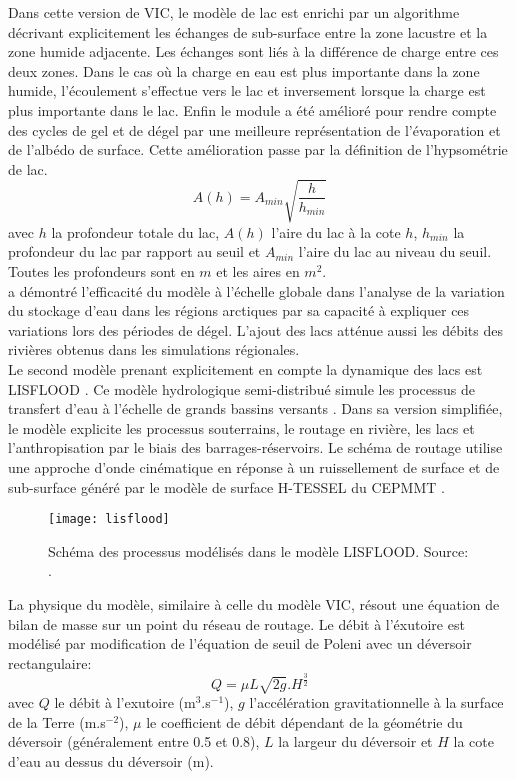 Dans cette version de VIC, le modèle de lac est enrichi par un algorithme décrivant explicitement les échanges de sub-surface entre la zone lacustre et la zone humide adjacente. Les échanges sont liés à la différence de charge entre ces deux zones. Dans le cas où la charge en eau est plus importante dans la zone humide, l'écoulement s'effectue vers le lac et inversement lorsque la charge est plus importante dans le lac. Enfin le module a été amélioré pour rendre compte des cycles de gel et de dégel par une meilleure représentation de l'évaporation et de l'albédo de surface. Cette amélioration passe par la définition de l'hypsométrie de lac.
\begin{equation}
A(h) = A_{min} \sqrt{\frac{h}{h_{min}}}
\end{equation}
avec $h$ la profondeur totale du lac, $A(h)$ l'aire du lac à la cote $h$, $h_{min}$ la profondeur du lac par rapport au seuil et $A_{min}$ l'aire du lac au niveau du seuil. Toutes les profondeurs sont en $m$ et les aires en $m^{2}$.\\

\citet{bowling2010} a démontré l’efficacité du modèle à l'échelle globale dans l’analyse de la variation du stockage d'eau dans les régions arctiques par sa capacité à expliquer ces variations lors des périodes de dégel. L'ajout des lacs atténue aussi les débits des rivières obtenus dans les simulations régionales. \\

Le second modèle prenant explicitement en compte la dynamique des lacs est LISFLOOD \citep{burek2013}. Ce modèle hydrologique semi-distribué simule les processus de transfert d'eau à l'échelle de grands bassins versants \citep{de2000}. Dans sa version simplifiée, le modèle explicite les processus souterrains, le routage en rivière, les lacs et l'anthropisation par le biais des barrages-réservoirs. Le schéma de routage utilise une approche d'onde cinématique en réponse à un ruissellement de surface et de sub-surface généré par le modèle de surface H-TESSEL du CEPMMT \citep[figure \ref{lisflood},][]{balsamo2009}. 

\begin{figure}[h!]
 \centerline{\texttt{[image: lisflood]}}
 \caption{Schéma des processus modélisés dans le modèle LISFLOOD. Source: \citet{burek2013}.}
 \label{lisflood}
\end{figure}


La physique du modèle, similaire à celle du modèle VIC, résout une équation de bilan de masse sur un point du réseau de routage. Le débit à l'éxutoire est modélisé par modification de l'équation de seuil de Poleni avec un déversoir rectangulaire: 
\begin{equation}
Q = \mu L\sqrt{2g}.H^{\frac{3}{2}}
\end{equation}
avec $Q$ le débit à l'exutoire (m$^{3}$.s$^{-1}$), $g$ l'accélération gravitationnelle à la surface de la Terre (m.s$^{-2}$), $\mu$ le coefficient de débit dépendant de la géométrie du déversoir (généralement entre 0.5 et 0.8), $L$ la largeur du déversoir et $H$ la cote d'eau au dessus du déversoir (m).\\


